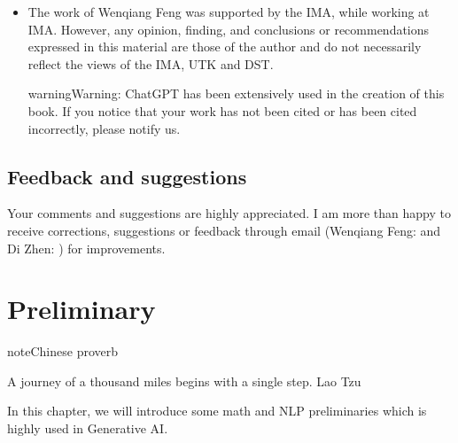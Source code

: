 \documentclass[letterpaper,11pt,english]{sphinxmanual}
\begin{document}
\begin{itemize}
\item {} 
\sphinxAtStartPar
{}

\sphinxAtStartPar
The work of Wenqiang Feng was supported by the IMA, while working at IMA. However, any opinion, finding,
and conclusions or recommendations expressed in this material are those of the author and do not necessarily
reflect the views of the IMA, UTK and DST.

\begin{sphinxadmonition}{warning}{Warning:}
\sphinxAtStartPar
ChatGPT has been extensively used in the creation of this book. If you notice that your work has not been
cited or has been cited incorrectly, please notify us.
\end{sphinxadmonition}

\end{itemize}


\section{Feedback and suggestions}
\label{\detokenize{preface:feedback-and-suggestions}}
\sphinxAtStartPar
Your comments and suggestions are highly appreciated. I am more than happy to receive
corrections, suggestions or feedback through email (Wenqiang Feng:  and
Di Zhen: 
) for improvements.

\sphinxstepscope


\chapter{Preliminary}
\label{\detokenize{prelim:preliminary}}\label{\detokenize{prelim:prelim}}\label{\detokenize{prelim::doc}}
\begin{sphinxadmonition}{note}{Chinese proverb}

\sphinxAtStartPar
A journey of a thousand miles begins with a single step. \textendash{} Lao Tzu
\end{sphinxadmonition}

\sphinxAtStartPar
In this chapter, we will introduce some math and NLP preliminaries which is highly
used in Generative AI.
\end{document}
